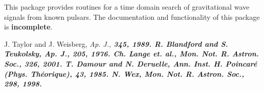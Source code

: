 This package provides routines for a time domain search of gravitational wave
signals from known pulsars.  The documentation and functionality of this
package is \textbf{incomplete}.
\newpage
\newpage
\newpage\begin{thebibliography}{0}
        J. Taylor and J. Weisberg, \it{Ap. J.}, \bf{345}, 1989.
        R. Blandford and S. Teukolsky, \it{Ap. J.}, \bf{205}, 1976.
        Ch. Lange {\it et. al.}, \it{Mon. Not. R. Astron. Soc.}, \bf{326}, 2001.
        T. Damour and N. Deruelle, \it{Ann. Inst. H. Poincar\'e (Phys. Th\'eorique)}, \bf{43}, 1985.
        N. Wex, \it{Mon. Not. R. Astron. Soc.}, \bf{298}, 1998.
\end{thebibliography}
\newpage
\newpage

